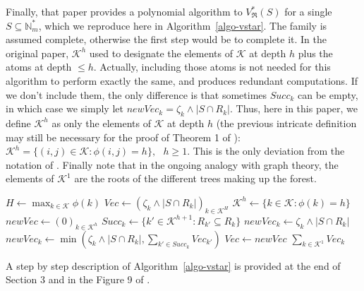 \documentclass[
  11pt,
  a4paper,
]{article}
\theoremstyle{plain}
\theoremstyle{plain}
\theoremstyle{definition}
\theoremstyle{plain}
\theoremstyle{definition}
\theoremstyle{remark}
\begin{document}
Finally, that paper provides a polynomial algorithm to
\(V^*_{\mathfrak{R}}(S)\) for a single \(S\subseteq\mathbb{N}_m^*\),
which we reproduce here in Algorithm~\ref{algo-vstar}. The family is
assumed complete, otherwise the first step would be to complete it. In
the original paper, \(\mathcal{K}^h\) used to designate the elements of
\(\mathcal{K}\) at depth \(h\) plus the atoms at depth \(\leq h\).
Actually, including those atoms is not needed for this algorithm to
perform exactly the same, and produces redundant computations. If we
don't include them, the only difference is that sometimes \(Succ_k\) can
be empty, in which case we simply let
\(newVec_k=\zeta_k\wedge|S\cap R_k|\). Thus, here in this paper, we
define \(\mathcal{K}^h\) as only the elements of \(\mathcal{K}\) at
depth \(h\) (the previous intricate definition may still be necessary
for the proof of Theorem 1 of \citet{MR4178188}):
\(\mathcal{K}^h=\{ (i,j)\in\mathcal{K}: \phi(i,j)=h      \}, \:\:\:h\geq 1.\)
This is the only deviation from the notation of \citet{MR4178188}.
Finally note that in the ongoing analogy with graph theory, the elements
of \(\mathcal{K}^1\) are the roots of the different trees making up the
forest.

\begin{algorithm}[htb!]
\caption{\label{algo-vstar}Computation of a given $V^*_{\mathfrak{R}}(S)$ with a complete family}
\begin{algorithmic}[1]
  \State $ H \gets \max_{k\in\mathcal{K}} \phi(k)  $ 
  \State $Vec\gets (\zeta_{k}\wedge|S\cap R_k|)_{k \in  \mathcal{K}^H}$ 
    \State $\mathcal{K}^h\gets \{ k\in\mathcal{K} : \phi(k) =h  \}$
    \State $newVec\gets (0)_{k \in  \mathcal{K}^h}$
      \State $Succ_k \gets \{ k' \in  \mathcal{K}^{h+1} : R_{k'}\subseteq R_k\}$
        \State $newVec_k \gets \zeta_k\wedge|S\cap R_k|$
      \Else
        \State $newVec_k \gets \min\left( \zeta_{k}\wedge|S\cap R_k| ,  \sum_{k'\in Succ_k} Vec_{k'}   \right)$
      \EndIf
    \EndFor
    \State $Vec\gets newVec$
  \EndFor
  \State\Return $\sum_{k\in\mathcal{K}^1} Vec_k  $
\EndProcedure
\end{algorithmic}
\end{algorithm}

A step by step description of Algorithm~\ref{algo-vstar} is provided at
the end of Section 3 and in the Figure 9 of \citet{MR4178188}.
\end{document}
